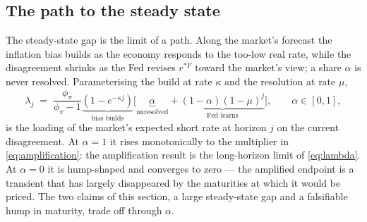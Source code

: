 \documentclass[11pt]{article}
\begin{document}
\subsection{The path to the steady state}
\label{sec:path}
The steady-state gap is the limit of a path. Along the market's forecast the inflation bias
builds as the economy responds to the too-low real rate, while the disagreement shrinks as the
Fed revises $r^{*F}$ toward the market's view; a share $\alpha$ is never resolved. Parameterising
the build at rate $\kappa$ and the resolution at rate $\mu$,
\begin{equation}
\lambda_j \;=\; \frac{\phi_\pi}{\phi_\pi-1}\underbrace{\left(1-e^{-\kappa j}\right)}_{\text{bias builds}}
\Big[\underbrace{\alpha}_{\text{unresolved}} + \underbrace{(1-\alpha)(1-\mu)^{j}}_{\text{Fed learns}}\Big],
\qquad \alpha\in[0,1],
\label{eq:lambda}
\end{equation}
is the loading of the market's expected short rate at horizon $j$ on the current disagreement.
At $\alpha=1$ it rises monotonically to the multiplier in \eqref{eq:amplification}: the
amplification result is the long-horizon limit of \eqref{eq:lambda}. At $\alpha=0$ it is
hump-shaped and converges to zero --- the amplified endpoint is a transient that has largely
disappeared by the maturities at which it would be priced. The two claims of this section, a
large steady-state gap and a falsifiable hump in maturity, trade off through $\alpha$.
\end{document}
